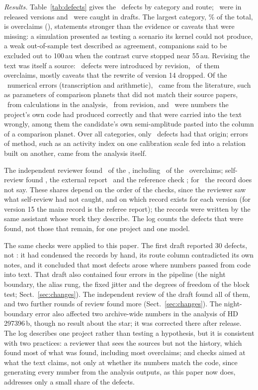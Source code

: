 \emph{Results.} Table~\ref{tab:defects} gives the \nmDefN\ defects by category and
route; \nmDefReleased\ were in released versions and \nmDefDraft\ were caught in
drafts. The largest category, \nmDefOverPct\% of the total, is overclaims
(\nmDefCatOverclaim), statements stronger than the evidence or caveats that were missing: a simulation presented as testing a
scenario its kernel could not produce, a weak out-of-sample test described as
agreement, companions said to be excluded out to 100\,au when the contrast curve
stopped near 55\,au. Revising the text was itself a source: \nmDefOriRev\ defects
were introduced by revision, \nmDefRevOver\ of them overclaims, mostly caveats that the
rewrite of version 14 dropped. Of the \nmDefNumN\ numerical errors (transcription and
arithmetic), \nmDefNumLit\ came from the literature, such as parameters of comparison
planets that did not match their source papers, \nmDefNumAna\ from calculations in the
analysis, \nmDefNumRev\ from revision, and \nmDefNumCode\ were numbers the project's own
code had produced correctly and that were carried into the text wrongly, among them the
candidate's own semi-amplitude pasted into the column of a comparison planet. Over all
categories, only \nmDefOriCode\ defects had that origin; errors of method, such as an
activity index on one calibration scale fed into a relation built on another, came from
the analysis itself.

The independent reviewer found \nmDefRouteRev\ of the \nmDefN, including
\nmDefOverRev\ of the \nmDefCatOverclaim\ overclaims; self-review found \nmDefRouteSelf,
the external report \nmDefRouteExt\ and the reference check \nmDefRouteRef; for
\nmDefRouteUnatt\ the record does not say. These shares depend on the order of the
checks, since the reviewer saw what self-review had not caught, and on which record exists
for each version (for version 15 the main record is the referee report); the records were
written by the same assistant whose work they describe. The log counts the defects
that were found, not those that remain, for one project and one model.

The same checks were applied to this paper. The first draft reported 30 defects, not
\nmDefN: it had condensed the records by hand, its route column contradicted its own
notes, and it concluded that most defects arose where numbers passed from code into
text. That draft also contained four errors in the pipeline (the night boundary, the
alias rung, the fixed jitter and the degrees of freedom of the block test;
Sect.~\ref{sec:changes}). The independent review of the draft found all of them, and two further rounds of review found more (Sect.~\ref{sec:changes}). The night-boundary error also
affected two archive-wide numbers in the analysis of HD\,297396\,b, though no result about
the star; it was corrected there after release. The log describes one project rather than
testing a hypothesis, but it is consistent with two practices: a reviewer that sees the
sources but not the history, which found most of what was found, including most
overclaims; and checks aimed at what the text claims, not only at whether its numbers
match the code, since generating every number from the analysis outputs, as this paper
now does, addresses only a small share of the defects.

